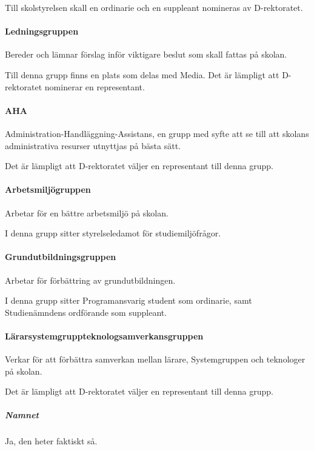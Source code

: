 \documentclass{dgovdoc}
\begin{document}
Till skolstyrelsen skall en ordinarie och en suppleant nomineras av
D-rektoratet.

\paragraph{Ledningsgruppen}

Bereder och lämnar förslag inför viktigare beslut som skall fattas på skolan.

Till denna grupp finns en plats som delas med Media. Det är lämpligt att
D-rektoratet nominerar en representant.

\paragraph{AHA}

Administration-Handläggning-Assistans, en grupp med syfte att se till att
skolans administrativa resurser utnyttjas på bästa sätt.

Det är lämpligt att D-rektoratet väljer en representant till denna grupp.

\paragraph{Arbetsmiljögruppen}

Arbetar för en bättre arbetsmiljö på skolan.

I denna grupp sitter styrelseledamot för studiemiljöfrågor.

\paragraph{Grundutbildningsgruppen}

Arbetar för förbättring av grundutbildningen.

I denna grupp sitter Programansvarig student som ordinarie, samt Studienämndens
ordförande som suppleant.

\paragraph{Lärarsystemgruppteknologsamverkansgruppen}

Verkar för att förbättra samverkan mellan lärare, Systemgruppen och teknologer
på skolan.

Det är lämpligt att D-rektoratet väljer en representant till denna grupp.

\subparagraph{Namnet}

Ja, den heter faktiskt så.
\end{document}
